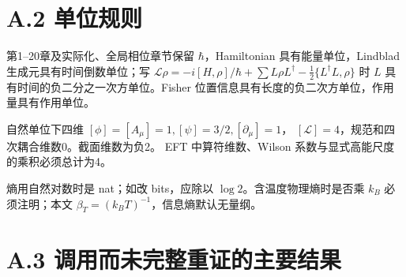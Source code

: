\documentclass[
  11pt,
  oneside]{book}
\begin{document}
\hypertarget{a.2-ux5355ux4f4dux89c4ux5219}{%
\section{A.2 单位规则}\label{a.2-ux5355ux4f4dux89c4ux5219}}

第1--20章及实际化、全局相位章节保留 \(\hbar\)，Hamiltonian
具有能量单位，Lindblad 生成元具有时间倒数单位；写
\(\mathcal L\rho=-i[H,\rho]/\hbar+\sum L\rho L^\dagger-\frac12\{L^\dagger L,\rho\}\)
时 \(L\) 具有时间的负二分之一次方单位。Fisher
位置信息具有长度的负二次方单位，作用量具有作用单位。

自然单位下四维 \([\phi]=[A_\mu]=1,[\psi]=3/2,[\partial_\mu]=1\)，
\([\mathcal L]=4\)，规范和四次耦合维数0。截面维数为负2。 EFT
中算符维数、Wilson 系数与显式高能尺度的乘积必须总计为4。

熵用自然对数时是 nat；如改 bits，应除以 \(\log2\)。含温度物理熵时是否乘
\(k_B\) 必须注明；本文 \(\beta_T=(k_BT)^{-1}\)，信息熵默认无量纲。

\hypertarget{a.3-ux8c03ux7528ux800cux672aux5b8cux6574ux91cdux8bc1ux7684ux4e3bux8981ux7ed3ux679c}{%
\section{A.3
调用而未完整重证的主要结果}\label{a.3-ux8c03ux7528ux800cux672aux5b8cux6574ux91cdux8bc1ux7684ux4e3bux8981ux7ed3ux679c}}
\end{document}
